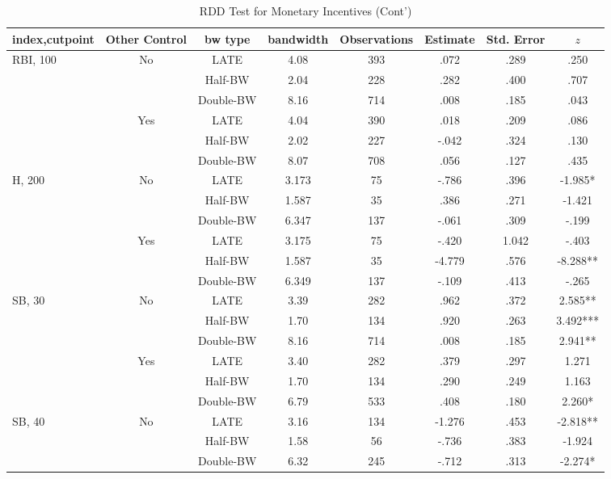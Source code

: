 \documentclass[dvipdfmx,12pt]{beamer}
\begin{document}
\begin{frame}\frametitle{}
  \begin{table}[!]
    \caption{RDD Test for Monetary Incentives (Cont')}
    \label{RDD_A}
    \tiny
    \centering
    \begin{tabular}{lccccccc}\hline
      index,cutpoint & Other Control & bw type & bandwidth
      & Observations & Estimate & Std. Error & $z$
      \\ \hline \hline
      RBI, 100 & No & LATE & 4.08 & 393 & .072 & .289 & .250 \\
      & &Half-BW & 2.04 & 228 & .282 & .400 & .707 \\
      & &Double-BW & 8.16 & 714 & .008 & .185 & .043 \\ \cline{3-8}

      & Yes & LATE & 4.04 & 390 & .018 & .209 & .086 \\
      & & Half-BW & 2.02 & 227 & -.042 & .324 & .130 \\
      & & Double-BW & 8.07 & 708 & .056 & .127 & .435 \\ \hline

      H, 200& No & LATE & 3.173 & 75 & -.786 & .396 & -1.985* \\
      & & Half-BW & 1.587 & 35 & .386 & .271 & -1.421 \\
      & & Double-BW & 6.347 & 137 & -.061 & .309 & -.199 \\ \cline{3-8}

      & Yes & LATE & 3.175 & 75 & -.420 & 1.042 & -.403 \\
      & & Half-BW & 1.587 & 35 & -4.779 & .576 & -8.288** \\
      & & Double-BW & 6.349 & 137 & -.109 & .413 & -.265 \\ \hline

      SB, 30 & No & LATE & 3.39 & 282 & .962 & .372 & 2.585** \\
      & &Half-BW & 1.70 & 134 & .920 & .263 & 3.492*** \\
      & &Double-BW & 8.16 & 714 & .008 & .185 & 2.941** \\ \cline{3-8}

      & Yes & LATE & 3.40 & 282 & .379 & .297 & 1.271 \\
      & & Half-BW & 1.70 & 134 & .290 & .249 & 1.163 \\
      & & Double-BW & 6.79 & 533 & .408 & .180 & 2.260* \\ \hline

      SB, 40 & No & LATE & 3.16 & 134 & -1.276 & .453 & -2.818** \\
      & &Half-BW & 1.58 & 56 & -.736 & .383 & -1.924 \\
      & &Double-BW & 6.32 & 245 & -.712 & .313 & -2.274* \\ \cline{3-8}


\end{tabular}
\end{table}
\end{frame}
\end{document}
